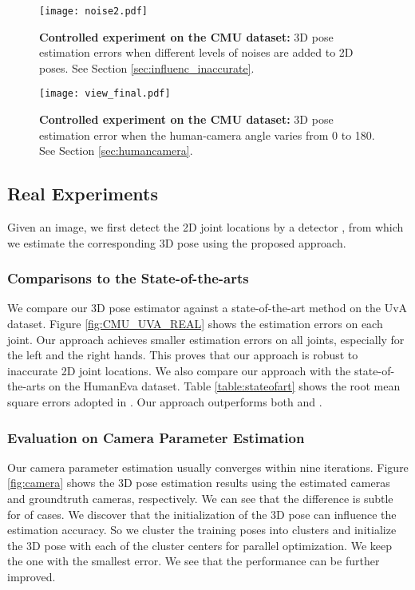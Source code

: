 \documentclass[10pt,twocolumn,letterpaper]{article}
\begin{document}
\begin{figure}
\centering
\texttt{[image: noise2.pdf]}
\caption{\textbf{Controlled experiment on the CMU dataset:} 3D
pose estimation errors when different levels of noises are added
to 2D poses. See Section \ref{sec:influenc_inaccurate}.}
\vspace{-1em} \label{fig:noise_CMU}
\end{figure}

\begin{figure}
\centering
\texttt{[image: view\_final.pdf]}
\caption{\textbf{Controlled experiment on the CMU dataset:} 3D
pose estimation error when the human-camera angle varies from 0 to
180. See Section \ref{sec:humancamera}.} \vspace{-1em}
\label{fig:camera_angle}
\end{figure}

\subsection{Real Experiments}
Given an image, we first detect the 2D joint locations by a detector
\cite{Yang2D}, from which we estimate the corresponding 3D pose
using the proposed approach.

\subsubsection{Comparisons to the State-of-the-arts}
\label{sec:realexperiment} We compare our 3D pose estimator
against a state-of-the-art method \cite{Ramakrishna} on the UvA
dataset. Figure \ref{fig:CMU_UVA_REAL} shows the estimation errors
on each joint. Our approach achieves smaller estimation errors on
all joints, especially for the left and the right hands. This
proves that our approach is robust to inaccurate 2D joint
locations. We also compare our approach with the state-of-the-arts \cite{SimoSerraCVPR2012} \cite{Daubney} on the HumanEva
dataset. Table \ref{table:stateofart} shows the root mean square
errors adopted in \cite{SimoSerraCVPR2012}. Our approach
outperforms both \cite{SimoSerraCVPR2012} and \cite{Daubney}.


\subsubsection{Evaluation on Camera Parameter Estimation}
\label{sec:exp_camera} Our camera parameter estimation usually
converges within nine iterations. Figure \ref{fig:camera} shows
the 3D pose estimation results using the estimated cameras and
groundtruth cameras, respectively. We can see
that the difference is subtle for  of cases. We discover
that the initialization of the 3D pose can influence the
estimation accuracy. So we cluster the training poses into 
clusters and initialize the 3D pose with each of the cluster
centers for parallel optimization. We keep the one with the
smallest error. We see that the performance can be further improved.
\end{document}

